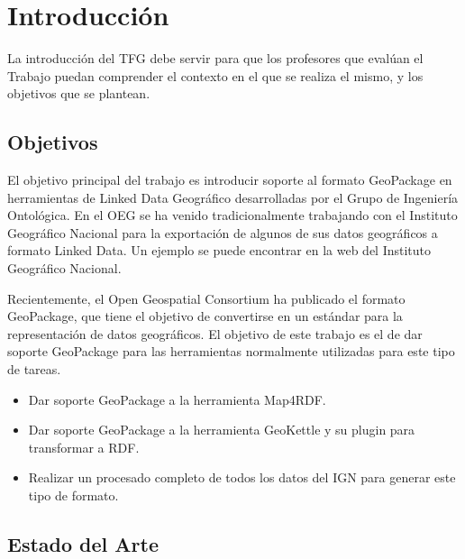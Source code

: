 \chapter{Introducción}
La introducción del TFG debe servir para que los profesores que evalúan el Trabajo puedan comprender el contexto
en el que se realiza el mismo, y los objetivos que se plantean.

\section{Objetivos} El objetivo principal del trabajo es introducir soporte al formato GeoPackage en herramientas
de Linked Data Geográfico desarrolladas por el Grupo de Ingeniería Ontológica. En el OEG se ha venido
tradicionalmente trabajando con el Instituto Geográfico Nacional para la exportación de algunos de sus datos
geográficos a formato Linked Data. Un ejemplo se puede encontrar en la web del Instituto Geográfico Nacional.
\cite{ign}

Recientemente, el Open Geospatial Consortium ha publicado el formato GeoPackage, que tiene el objetivo de
convertirse en un estándar para la representación de datos geográficos. El objetivo de este trabajo es el de dar
soporte GeoPackage para las herramientas normalmente utilizadas para este tipo de tareas.

\begin{itemize} \item Dar soporte GeoPackage a la herramienta Map4RDF. \item Dar soporte GeoPackage a la
herramienta GeoKettle y su plugin para transformar a RDF. \item Realizar un procesado completo de todos los
datos del IGN para generar este tipo de formato. \end{itemize}

\section{Estado del Arte}

